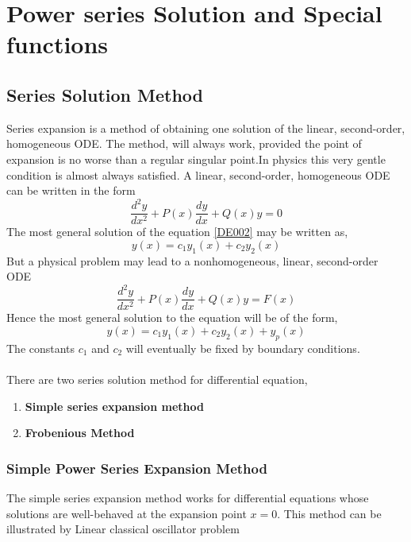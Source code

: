 \chapter{Power series Solution and Special functions}
\section{Series Solution Method}
Series expansion is a  method of obtaining one solution of the linear, second-order, homogeneous ODE. The method, will always work, provided the point of expansion is no worse than a regular singular point.In physics this very gentle condition is almost always satisfied. 
A linear, second-order, homogeneous ODE can be written in the form
\begin{equation}
\frac{d^{2} y}{d x^{2}}+P(x) \frac{d y}{d x}+Q(x) y=0 \label{DE002}
\end{equation}
The most general solution of the equation \ref{DE002} may be written as,
\begin{equation}
y(x)=c_{1} y_{1}(x)+c_{2} y_{2}(x)
\end{equation}
But a physical problem may lead to a nonhomogeneous, linear, second-order ODE
\begin{equation}
\frac{d^{2} y}{d x^{2}}+P(x) \frac{d y}{d x}+Q(x) y=F(x)\label{DE003}
\end{equation}
Hence the most general solution to the equation \label{DE003} will be of the form,
\begin{equation}
y(x)=c_{1} y_{1}(x)+c_{2} y_{2}(x)+y_{p}(x)
\end{equation}
The constants $c_{1}$ and $c_{2}$ will eventually be fixed by boundary conditions.\\\\
There are two series solution method  for differential equation,
\begin{enumerate}
	\item \textbf{Simple series expansion method}
	\item \textbf{Frobenious Method}
\end{enumerate}
\subsection{Simple Power Series Expansion Method}
The simple series expansion method works for differential equations whose solutions are well-behaved at the expansion point $x = 0$.
This method can be illustrated by Linear classical oscillator problem
